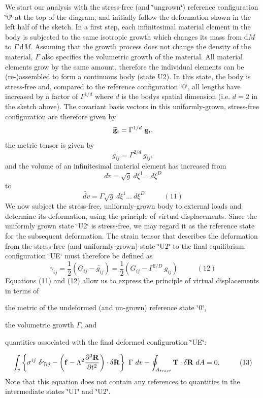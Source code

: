 We start our analysis with the stress-\/free (and \char`\"{}ungrown\char`\"{}) reference configuration \char`\"{}0\char`\"{} at the top of the diagram, and initially follow the deformation shown in the left half of the sketch. In a first step, each infinitesimal material element in the body is subjected to the same isotropic growth which changes its mass from $\mbox{d}M$ to $ \Gamma \ \mbox{d}M $. Assuming that the growth process does not change the density of the material, $ \Gamma$ also specifies the volumetric growth of the material. All material elements grow by the same amount, therefore the individual elements can be (re-\/)assembled to form a continuous body (state U2). In this state, the body is stress-\/free and, compared to the reference configuration \char`\"{}0\char`\"{}, all lengths have increased by a factor of $\Gamma^{1/d}$ where $ d $ is the body\textquotesingle{}s spatial dimension (i.\+e. $d=2$ in the sketch above). The covariant basis vectors in this uniformly-\/grown, stress-\/free configuration are therefore given by \[ \widetilde{\bf g}_i = \Gamma^{1/d} \ {\bf g}_i, \] the metric tensor is given by \[ \widetilde{g_{ij}} = \Gamma^{2/d} \ g_{ij}, \] and the volume of an infinitesimal material element has increased from \[ dv = \sqrt{g} \ d\xi^1 ... \ d\xi^D \] to \[ \widetilde{dv} = \Gamma \sqrt{g} \ d\xi^1 ... \ d\xi^D \ \ \ \ \ \ \ \ \ \ \ \ (11) \] We now subject the stress-\/free, uniformly-\/grown body to external loads and determine its deformation, using the principle of virtual displacements. Since the uniformly grown state \char`\"{}\+U2\char`\"{} is stress-\/free, we may regard it as the reference state for the subsequent deformation. The strain tensor that describes the deformation from the stress-\/free (and uniformly-\/grown) state \char`\"{}\+U2\char`\"{} to the final equilibrium configuration \char`\"{}\+U\+E\char`\"{} must therefore be defined as \[ \gamma_{ij} = \frac{1}{2} \left(G_{ij} - \widetilde{g_{ij}}\right) = \frac{1}{2} \left(G_{ij} - \Gamma^{2/D} \ g_{ij} \right) \ \ \ \ \ \ \ \ \ \ \ \ (12) \] Equations (11) and (12) allow us to express the principle of virtual displacements in terms of
\begin{DoxyItemize}
\item the metric of the undeformed (and un-\/grown) reference state \char`\"{}0\char`\"{},
\item the volumetric growth $ \Gamma $, and
\item quantities associated with the final deformed configuration \char`\"{}\+U\+E\char`\"{}\+:
\end{DoxyItemize}\[ \int_{v} \left\{ \sigma^{ij} \ \delta \gamma_{ij} - \left( {\bf f} - \Lambda^2 \frac{\partial^2 {\bf R}}{\partial t^{2}} \right) \cdot \delta {\bf R} \right\} \ \Gamma \ dv -\oint_{A_{tract}} {\bf T} \cdot \delta {\bf R} \ dA =0, \ \ \ \ \ \ \ \ (13) \] Note that this equation does not contain any references to quantities in the intermediate states \char`\"{}\+U1\char`\"{} and \char`\"{}\+U2\char`\"{}.

